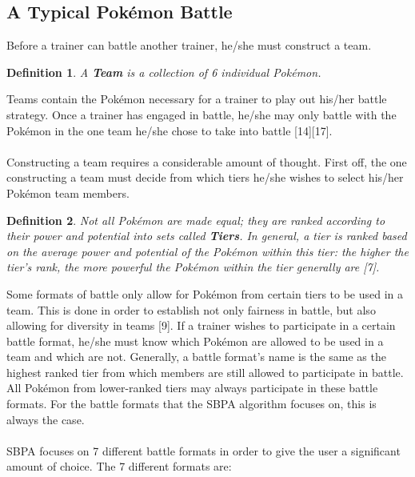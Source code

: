 \documentclass{article}
\newtheorem{definition}{Definition}
\begin{document}
\subsection{A Typical Pok\'emon Battle}
Before a trainer can battle another trainer, he/she must construct a team. 
\begin{definition}
	A \textbf{Team} is a collection of 6 individual Pok\'emon.
\end{definition}
Teams contain the Pok\'emon necessary for a trainer to play out his/her battle strategy. Once a trainer has engaged in battle, he/she may only battle with the Pok\'emon in the one team he/she chose to take into battle [14][17].\\\\
Constructing a team requires a considerable amount of thought. First off, the one constructing a team must decide from which tiers he/she wishes to select his/her Pok\'emon team members.
\begin{definition}\label{tierdef}
	Not all Pok\'emon are made equal; they are ranked according to their power and potential into sets called \textbf{Tiers}. In general, a tier is ranked based on the average power and potential of the Pok\'emon within this tier: the higher the tier's rank, the more powerful the Pok\'emon within the tier generally are [7].
\end{definition} 
Some formats of battle only allow for Pok\'emon from certain tiers to be used in a team. This is done in order to establish not only fairness in battle, but also allowing for diversity in teams [9]. If a trainer wishes to participate in a certain battle format, he/she must know which Pok\'emon are allowed to be used in a team and which are not. Generally, a battle format's name is the same as the highest ranked tier from which members are still allowed to participate in battle. All Pok\'emon from lower-ranked tiers may always participate in these battle formats. For the battle formats that the SBPA algorithm focuses on, this is always the case.\\\\
SBPA focuses on 7 different battle formats in order to give the user a significant amount of choice. The 7 different formats are:
\end{document}
